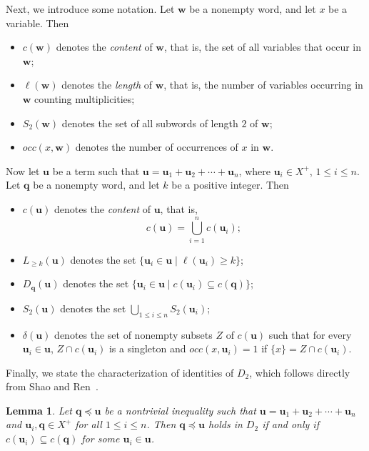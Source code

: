 \documentclass[reqno]{amsart}
\theoremstyle{plain}
\newtheorem{lem}[thm]{Lemma}
\theoremstyle{definition}
\newcommand{\bq}{\mathbf{q}}
\newcommand{\bu}{\mathbf{u}}
\newcommand{\bw}{\mathbf{w}}
\begin{document}
Next, we introduce some notation.
Let $\bw$ be a nonempty word, and let $x$ be a variable. Then
\begin{itemize}
\item $c(\bw)$ denotes the \emph{content} of $\bw$, that is, the set of all variables that occur in $\bw$;

\item $\ell(\bw)$ denotes the \emph{length} of $\bw$, that is, the number of variables occurring in $\bw$ counting multiplicities;

\item $S_2(\bw)$ denotes the set of all subwords of length $2$ of $\bw$;

\item $occ(x, \bw)$ denotes the number of occurrences of $x$ in $\bw$.
\end{itemize}

Now let $\bu$ be a term such that $\bu=\bu_1+\bu_2+\cdots+\bu_n$,
where $\bu_i \in X^+$, $1 \leq i \leq n$.
Let $\bq$ be a nonempty word, and let $k$ be a positive integer. Then
\begin{itemize}
\item $c(\bu)$ denotes the \emph{content} of $\bu$, that is,
\[
c(\bu)=\bigcup_{i=1}^n c(\bu_i);
\]

\item $L_{\geq k}(\bu)$ denotes the set $\{\bu_i \in \bu \mid \ell(\bu_i)\geq k\}$;

\item $D_{\bq}(\bu)$ denotes the set $\{\bu_i \in \bu \mid c(\bu_i)\subseteq c(\bq)\}$;

\item $S_2(\bu)$ denotes the set $\bigcup_{1\leq i \leq n}S_2(\bu_i)$;

\item $\delta(\bu)$ denotes the set of nonempty subsets $Z$ of $c(\bu)$ such that for every
 $\bu_i\in\bu$, $Z\cap c(\bu_i)$ is a singleton and $occ(x,\bu_i)=1$ if $\{x\}=Z\cap c(\bu_i)$.
\end{itemize}

Finally, we state the characterization of identities of $D_2$, which follows directly from Shao and Ren~\cite[Lemma 1.1]{sr}.
\begin{lem}\label{lem01}
Let $\bq\preceq\bu$ be a nontrivial inequality such that
$\bu=\bu_1+\bu_2+\cdots+\bu_n$ and $\bu_i, \bq \in X^+$ for all $1\leq i \leq n$. Then
$\bq\preceq\bu$ holds in $D_2$ if and only if $c(\bu_i) \subseteq c(\bq)$ for some $\bu_i \in \bu$.
\end{lem}
\end{document}
